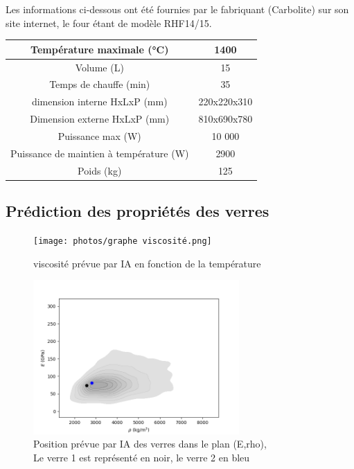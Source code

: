 \documentclass{article}
\begin{document}
Les informations ci-dessous ont été fournies par le fabriquant (Carbolite) sur son site internet, le four étant de modèle RHF14/15.

\begin{table}[ht]
    \centering
\begin{tabular}{|c|c|}
\hline
Température maximale (°C) & 1400  \\
\hline
Volume (L) & 15 \\
\hline
Temps de chauffe (min) & 35 \\
\hline
dimension interne HxLxP (mm) & 220x220x310 \\
\hline
Dimension externe HxLxP (mm) & 810x690x780 \\
\hline
Puissance max (W) & 10 000 \\
\hline
Puissance de maintien à température (W) & 2900 \\
\hline
Poids (kg) & 125 \\
\hline
\end{tabular} 
\end{table}



\subsection{Prédiction des propriétés des verres}
\begin{figure}[ht]
    \centering
    \texttt{[image: photos/graphe viscosité.png]}
    \caption{viscosité prévue par IA en fonction de la température}
\end{figure}

\begin{figure}[ht]
    \centering
    \includegraphics[width=0.7\textwidth]{photos/E rho.png}
    \caption{Position prévue par IA des verres dans le plan (E,rho),\\ Le verre 1 est représenté en noir, le verre 2 en bleu}
\end{figure}
\end{document}
